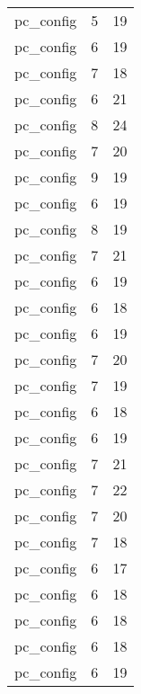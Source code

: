 \begin{table}
\begin{tabular}{lrr}
                       pc\_config &         5 &        19 \\
                       pc\_config &         6 &        19 \\
                       pc\_config &         7 &        18 \\
                       pc\_config &         6 &        21 \\
                       pc\_config &         8 &        24 \\
                       pc\_config &         7 &        20 \\
                       pc\_config &         9 &        19 \\
                       pc\_config &         6 &        19 \\
                       pc\_config &         8 &        19 \\
                       pc\_config &         7 &        21 \\
                       pc\_config &         6 &        19 \\
                       pc\_config &         6 &        18 \\
                       pc\_config &         6 &        19 \\
                       pc\_config &         7 &        20 \\
                       pc\_config &         7 &        19 \\
                       pc\_config &         6 &        18 \\
                       pc\_config &         6 &        19 \\
                       pc\_config &         7 &        21 \\
                       pc\_config &         7 &        22 \\
                       pc\_config &         7 &        20 \\
                       pc\_config &         7 &        18 \\
                       pc\_config &         6 &        17 \\
                       pc\_config &         6 &        18 \\
                       pc\_config &         6 &        18 \\
                       pc\_config &         6 &        18 \\
                       pc\_config &         6 &        19 \\

\end{tabular}
\end{table}
